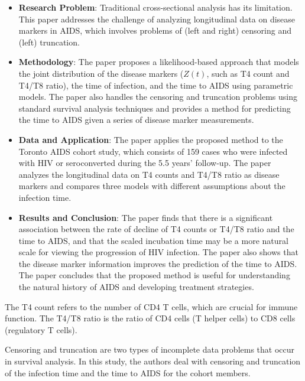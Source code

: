 \documentclass[UTF8,a4paper,10pt]{article}
\begin{document}
\begin{itemize}
  \item \textbf{Research Problem}: Traditional cross-sectional analysis has its limitation. This paper addresses the challenge of analyzing longitudinal data on disease markers in AIDS, which involves problems of (left and right) censoring and (left) truncation.
  \item \textbf{Methodology}: The paper proposes a likelihood-based approach that models the joint distribution of the disease markers (\(Z(t)\), such as T4 count and T4/T8 ratio), the time of infection, and the time to AIDS using parametric models. The paper also handles the censoring and truncation problems using standard survival analysis techniques and provides a method for predicting the time to AIDS given a series of disease marker measurements.
  \item \textbf{Data and Application}: The paper applies the proposed method to the Toronto AIDS cohort study, which consists of 159 cases who were infected with HIV or seroconverted during the 5.5 years' follow-up. The paper analyzes the longitudinal data on T4 counts and T4/T8 ratio as disease markers and compares three models with different assumptions about the infection time.
  \item \textbf{Results and Conclusion}: The paper finds that there is a significant association between the rate of decline of T4 counts or T4/T8 ratio and the time to AIDS, and that the scaled incubation time may be a more natural scale for viewing the progression of HIV infection. The paper also shows that the disease marker information improves the prediction of the time to AIDS. The paper concludes that the proposed method is useful for understanding the natural history of AIDS and developing treatment strategies.
\end{itemize}

\dotfill

The T4 count refers to the number of CD4 T cells, which are crucial for immune function. The T4/T8 ratio is the ratio of CD4 cells (T helper cells) to CD8 cells (regulatory T cells).

Censoring and truncation are two types of incomplete data problems that occur in survival analysis. In this study, the authors deal with censoring and truncation of the infection time and the time to AIDS for the cohort members.
\end{document}

